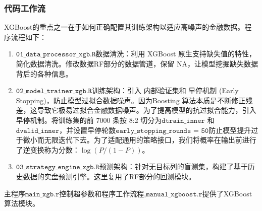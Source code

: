 \documentclass[11pt, a4paper]{article}
\begin{document}
\subsubsection{代码工作流}
XGBoost的重点之一在于如何正确配置其训练架构以适应高噪声的金融数据。程序流程如下：
\begin{enumerate}
  \item $\texttt{01\_data\_processor\_xgb.R}$数据清洗：利用 XGBoost 原生支持缺失值的特性，简化数据清洗。修改数据RF部分的数据管道，保留 NA，让模型挖掘缺失数据背后的各种信息。
  \item $\texttt{02\_model\_trainer\_xgb.R}$训练架构：引入 内部验证集和 早停机制 (Early Stopping)，防止模型过拟合数据噪声。因为Boosting 算法本质是不断修正残差，这导致它极易过拟合金融数据噪声。为了提高模型的抗过拟合能力，引入早停机制。将训练集的前 7000 条按 8:2 切分为$\texttt{dtrain\_inner}$ 和 $\texttt{dvalid\_inner}$，并设置早停轮数$\texttt{early\_stopping\_rounds = 50}$防止模型提升过于微小而无限迭代下去。为了适配通用的策略接口，我们将概率在输出前进行了逆变换称为分数：$\log(P / (1-P))$。
  \item $\texttt{03\_strategy\_engine\_xgb.R}$预测架构：针对无目标列的盲测集，构建了基于历史数据的实盘预测引擎。这里复用了RF部分的回测模块。
\end{enumerate}
主程序$\texttt{main\_xgb.r}$控制超参数和程序工作流程,$\texttt{manual\_xgboost.r}$提供了XGBoost算法模块。
\end{document}
